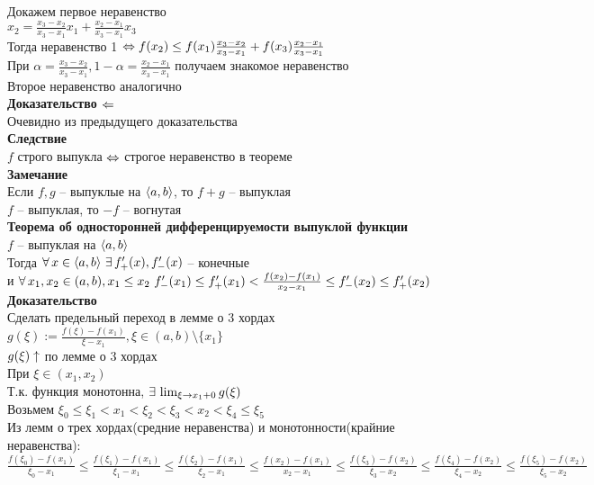 \documentclass[12pt]{article}
\begin{document}
Докажем первое неравенство\\
$x_2 = \frac{x_3-x_2}{x_3-x_1}x_1 + \frac{x_2-x_1}{x_3-x_1}x_3$\\
Тогда неравенство 1 $\Leftrightarrow f(x_2) \leq f(x_1) \frac{x_3-x_2}{x_3-x_1} + f(x_3)\frac{x_2-x_1}{x_3-x_1}$\\
При $\alpha = \frac{x_3-x_2}{x_3-x_1}, 1 - \alpha = \frac{x_2-x_1}{x_3-x_1}$ получаем знакомое неравенство\\
Второе неравенство аналогично\\
\textbf{Доказательство $\Leftarrow$}\\
Очевидно из предыдущего доказательства\\
\textbf{Следствие}\\
$f$ строго выпукла $\Leftrightarrow$ строгое неравенство в теореме\\
\textbf{Замечание}\\
Если $f,g$ -- выпуклые на $\langle a, b \rangle$, то $f+g$ -- выпуклая\\
$f$ -- выпуклая, то $-f$ -- вогнутая\\
\textbf{Теорема об односторонней дифференцируемости выпуклой функции}\\
$f$ -- выпуклая на $\langle a, b \rangle$\\
Тогда $\forall\, x \in \langle a, b \rangle\ \exists\, f_+'(x), f_-'(x)$ -- конечные\\
и $\fall x_1, x_2 \in (a,b), x_1 \leq x_2\ f_-'(x_1) \leq f_+'(x_1) < \frac{f(x_2)-f(x_1)}{x_2-x_1} \leq f_-'(x_2) \leq f_+'(x_2)$\\
\textbf{Доказательство}\\
Сделать предельный переход в лемме о 3 хордах\\
$g(\xi) := \frac{f(\xi)-f(x_1)}{\xi - x_1}, \xi \in (a,b) \setminus \{x_1\}$\\
$g(\xi) \uparrow$ по лемме о 3 хордах\\
При $\xi \in (x_1, x_2)$\\
Т.к. функция монотонна, $\exists\, \lim_{\xi \rightarrow x_1 + 0} g(\xi)$\\
Возьмем $\xi_0 \leq \xi_1 < x_1 < \xi_2 < \xi_3 < x_2 < \xi_4 \leq \xi_5$\\
Из лемм о трех хордах(средние неравенства) и монотонности(крайние неравенства):\\
$\frac{f(\xi_0)-f(x_1)}{\xi_0 - x_1} \leq \frac{f(\xi_1)-f(x_1)}{\xi_1 - x_1} \leq \frac{f(\xi_2)-f(x_1)}{\xi_2 - x_1} \leq \frac{f(x_2) -f(x_1)}{x_2-x_1} \leq \frac{f(\xi_3)-f(x_2)}{\xi_3 - x_2} \leq \frac{f(\xi_4)-f(x_2)}{\xi_4-x_2} \leq \frac{f(\xi_5)-f(x_2)}{\xi_5-x_2}$\\
\end{document}
